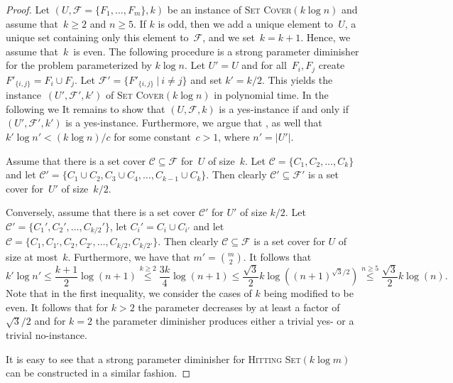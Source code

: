 \documentclass[11pt,a4,USenglish]{article}
\newcommand{\prob}[1]{\textsc{#1}}
\newcommand{\pprob}[2]{\prob{#1}$(#2)$}
\theoremstyle{definition}
\theoremstyle{plain}
\theoremstyle{remark}
\newcommand{\toappendix}[1]{%
%
  {{
    #1
  }}
}
\begin{document}
\begin{proof}
 Let $(U, \mathcal{F} = \{F_1, \ldots, F_m\}, k)$ be an instance of \pprob{Set Cover}{k\log n} and assume that~$k\geq 2$ and $n\geq 5$.
  If $k$ is odd, then we add a unique element to~$U$, a unique set containing only this element to~$\mathcal{F}$, and we set~$k=k+1$.
  Hence, we assume that~$k$~is even. 
  The following procedure is a strong parameter diminisher for the problem parameterized by $k\log n$. 
  Let $U' = U$ and for all~$F_i, F_j$ create $F'_{\{i, j\}} = F_i \cup F_j$. Let $\mathcal{F}' = \{F'_{\{i, j\}} \ | \ i\neq j\}$ and set $k' = k/2$.
  This yields the instance~$(U', \mathcal{F}', k')$ of \pprob{Set Cover}{k\log n} in polynomial time.
    \iflong{}In the following we \else{}It remains to \fi{}show that $(U, \mathcal{F}, k)$ is a yes-instance if and only if $(U', \mathcal{F}', k')$ is a yes-instance\iflong{}. Furthermore, we argue that \else{}, as well that \fi{}$k'\log n' < (k\log n)/c$ for some constant~$c>1$, where $n'=|U'|$.
  
  \toappendix
  {
%
%
    Assume that there is a set cover $\mathcal{C} \subseteq \mathcal{F}$ for~$U$ of size~$k$. 
    Let $\mathcal{C} = \{C_1, C_2, \ldots, C_k\}$ and let $\mathcal{C}' = \{C_1\cup C_2, C_3\cup C_4, \ldots, C_{k-1}\cup C_k\}$. 
    Then clearly $\mathcal{C}'\subseteq \mathcal{F}'$ is a set cover for~$U'$ of size~$k/2$. 
    
    Conversely, assume that there is a set cover $\mathcal{C}'$ for $U'$ of size $k/2$. 
    Let $\mathcal{C}' = \{C_1', C_2', \ldots, C_{k/2}'\}$, let $C_i'=C_i\cup C_{i'}$ and let $\mathcal{C} = \{C_1, C_{1'}, C_2, C_{2'},\ldots,C_{k/2},C_{k/2'}\}$. 
    Then clearly $\mathcal{C}\subseteq \mathcal{F}$ is a set cover for $U$ of size at most~$k$. 
    Furthermore, we have that $m' = {m \choose 2}$. It follows that
    \[k'\log n' \leq \frac{k+1}{2}\log (n+1) \stackrel{k\geq 2}{\leq} \frac{3k}{4}\log (n+1) \leq \frac{\sqrt{3}}{2}k\log ((n+1)^{\sqrt{3}/2}) \stackrel{n\geq 5}{\leq} \frac{\sqrt{3}}{2}k\log (n).\] 
    Note that in the first inequality, we consider the cases of $k$ being modified to be even.
    It follows that for $k>2$ the parameter decreases by at least a factor of $\sqrt{3}/{2}$ and for $k=2$ the parameter diminisher produces either a trivial yes- or a trivial no-instance.
%
  }
  
  It is easy to see that a strong parameter diminisher for \pprob{Hitting Set}{k \log m} can be constructed in a similar fashion.
\end{proof}
%
%
%
%
%
%
%
%
%
%
%
%
%
%
%
\end{document}
